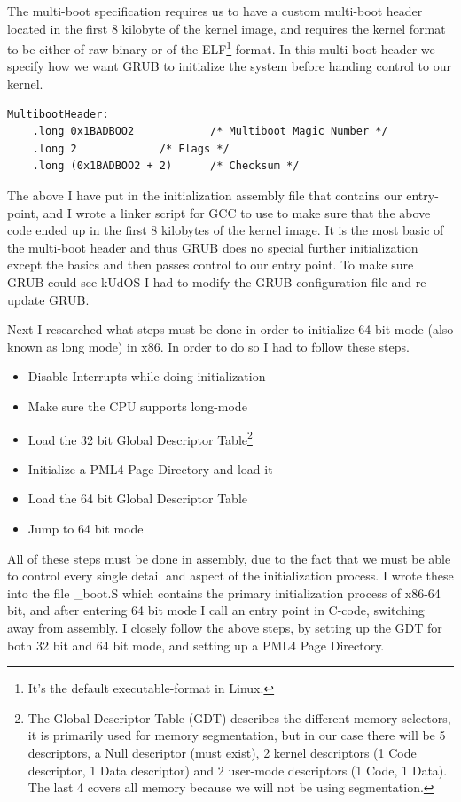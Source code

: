 The multi-boot specification requires us to have a custom multi-boot header located in the first 8 kilobyte of the kernel image, and requires the kernel format to be either of raw binary or of the ELF\footnote{It's the default executable-format in Linux.} format. In this multi-boot header we specify how we want GRUB to initialize the system before handing control to our kernel.

\begin{verbatim}
MultibootHeader:
	.long 0x1BADBOO2			/* Multiboot Magic Number */
	.long 2				/* Flags */
	.long (0x1BADBOO2 + 2)		/* Checksum */
\end{verbatim}

The above I have put in the initialization assembly file that contains our entry-point, and I wrote a linker script for GCC to use to make sure that the above code ended up in the first 8 kilobytes of the kernel image. It is the most basic of the multi-boot header and thus GRUB does no special further initialization except the basics and then passes control to our entry point. To make sure GRUB could see kUdOS I had to modify the GRUB-configuration file and re-update GRUB.

Next I researched what steps must be done in order to initialize 64 bit mode (also known as long mode) in x86. In order to do so I had to follow these steps.

\begin{itemize}
  \item Disable Interrupts while doing initialization
  \item Make sure the CPU supports long-mode
  \item Load the 32 bit Global Descriptor Table\footnote{The Global Descriptor Table (GDT) describes the different memory selectors, it is primarily used for memory segmentation, but in our case there will be 5 descriptors, a Null descriptor (must exist), 2 kernel descriptors (1 Code descriptor, 1 Data descriptor) and 2 user-mode descriptors (1 Code, 1 Data). The last 4 covers all memory because we will not be using segmentation.}
  \item Initialize a PML4 Page Directory and load it
  \item Load the 64 bit Global Descriptor Table
  \item Jump to 64 bit mode
\end{itemize}

All of these steps must be done in assembly, due to the fact that we must be able to control every single detail and aspect of the initialization process. I wrote these into the file \_boot.S which contains the primary initialization process of x86-64 bit, and after entering 64 bit mode I call an entry point in C-code, switching away from assembly. I closely follow the above steps, by setting up the GDT for both 32 bit and 64 bit mode, and setting up a PML4 Page Directory. 

